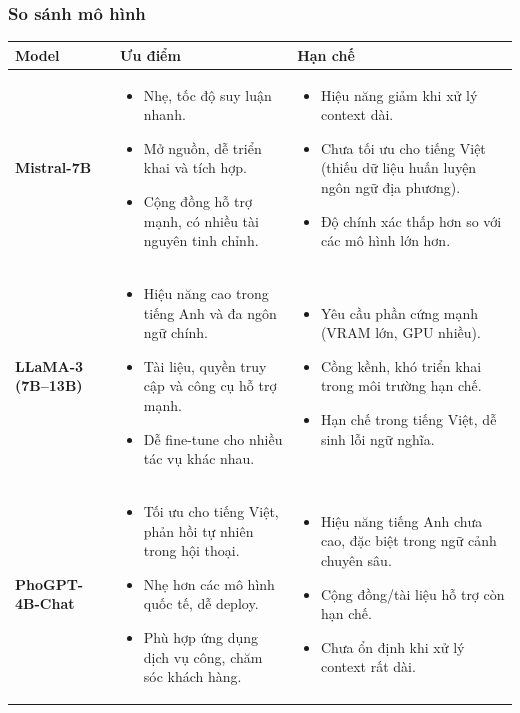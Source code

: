 \subsubsection{So sánh mô hình}
\begin{center}
\renewcommand{\arraystretch}{1.3}
\begin{tabular}{|p{3cm}|p{6cm}|p{6cm}|}
\hline
\textbf{Model} & \textbf{Ưu điểm} & \textbf{Hạn chế} \\
\hline
\textbf{Mistral-7B} &
\begin{itemize}[leftmargin=*]
    \item Nhẹ, tốc độ suy luận nhanh.
    \item Mở nguồn, dễ triển khai và tích hợp.
    \item Cộng đồng hỗ trợ mạnh, có nhiều tài nguyên tinh chỉnh.
\end{itemize}
&
\begin{itemize}[leftmargin=*]
    \item Hiệu năng giảm khi xử lý context dài.
    \item Chưa tối ưu cho tiếng Việt (thiếu dữ liệu huấn luyện ngôn ngữ địa phương).
    \item Độ chính xác thấp hơn so với các mô hình lớn hơn.
\end{itemize}
\\
\hline
\textbf{LLaMA-3 (7B–13B)} &
\begin{itemize}[leftmargin=*]
    \item Hiệu năng cao trong tiếng Anh và đa ngôn ngữ chính.
    \item Tài liệu, quyền truy cập và công cụ hỗ trợ mạnh.
    \item Dễ fine-tune cho nhiều tác vụ khác nhau.
\end{itemize}
&
\begin{itemize}[leftmargin=*]
    \item Yêu cầu phần cứng mạnh (VRAM lớn, GPU nhiều).
    \item Cồng kềnh, khó triển khai trong môi trường hạn chế.
    \item Hạn chế trong tiếng Việt, dễ sinh lỗi ngữ nghĩa.
\end{itemize}
\\
\hline
\textbf{PhoGPT-4B-Chat} &
\begin{itemize}[leftmargin=*]
    \item Tối ưu cho tiếng Việt, phản hồi tự nhiên trong hội thoại.
    \item Nhẹ hơn các mô hình quốc tế, dễ deploy.
    \item Phù hợp ứng dụng dịch vụ công, chăm sóc khách hàng.
\end{itemize}
&
\begin{itemize}[leftmargin=*]
    \item Hiệu năng tiếng Anh chưa cao, đặc biệt trong ngữ cảnh chuyên sâu.
    \item Cộng đồng/tài liệu hỗ trợ còn hạn chế.
    \item Chưa ổn định khi xử lý context rất dài.
\end{itemize}
\\
\hline
\end{tabular}
\end{center}
